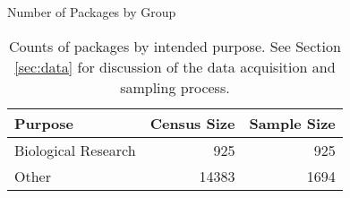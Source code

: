 \begin{table}[ht]
\centering
\caption{Number of Packages by Group}
\begin{tabular}{|l|rr|}
  \hline
Purpose & Census Size & Sample Size \\ 
  \hline
Biological Research & 925 & 925 \\ 
  Other & 14383 & 1694 \\  
   \hline
\end{tabular}
\captionsetup{width=0.8\textwidth}
\vspace{10pt}
\caption*{Counts of packages by intended purpose. See Section \ref{sec:data} for discussion of the data acquisition and sampling process.}
\label{tab:n_by_grp}
\end{table}
